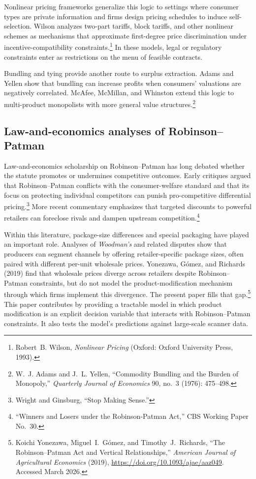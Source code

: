 \documentclass[12pt]{article}
\theoremstyle{definition}
\begin{document}
Nonlinear pricing frameworks generalize this logic to settings where consumer types are private information and firms design pricing schedules to induce self-selection.
Wilson analyzes two-part tariffs, block tariffs, and other nonlinear schemes as mechanisms that approximate first-degree price discrimination under incentive-compatibility constraints.\footnote{Robert~B. Wilson, \textit{Nonlinear Pricing} (Oxford: Oxford University Press, 1993).}
In these models, legal or regulatory constraints enter as restrictions on the menu of feasible contracts.

Bundling and tying provide another route to surplus extraction.
Adams and Yellen show that bundling can increase profits when consumers' valuations are negatively correlated. McAfee, McMillan, and Whinston extend this logic to multi-product monopolists with more general value structures.\footnote{W.~J. Adams and J.~L. Yellen, ``Commodity Bundling and the Burden of Monopoly,'' \textit{Quarterly Journal of Economics} 90, no.~3 (1976): 475--498.}

\subsection{Law-and-economics analyses of Robinson--Patman}

Law-and-economics scholarship on Robinson--Patman has long debated whether the statute promotes or undermines competitive outcomes.
Early critiques argued that Robinson--Patman conflicts with the consumer-welfare standard and that its focus on protecting individual competitors can punish pro-competitive differential pricing.\footnote{Wright and Ginsburg, ``Stop Making Sense.''}
More recent commentary emphasizes that targeted discounts to powerful retailers can foreclose rivals and dampen upstream competition.\footnote{``Winners and Losers under the Robinson-Patman Act,'' CBS Working Paper No.\ 30.}

Within this literature, package-size differences and special packaging have played an important role.
Analyses of \textit{Woodman's} and related disputes show that producers can segment channels by offering retailer-specific package sizes, often paired with different per-unit wholesale prices.
Yonezawa, G\'{o}mez, and Richards (2019) find that wholesale prices diverge across retailers despite Robinson--Patman constraints, but do not model the product-modification mechanism through which firms implement this divergence. The present paper fills that gap.\footnote{Koichi Yonezawa, Miguel~I.\ G\'{o}mez, and Timothy~J.\ Richards, ``The Robinson--Patman Act and Vertical Relationships,'' \textit{American Journal of Agricultural Economics} (2019), \url{https://doi.org/10.1093/ajae/aaz049}. Accessed March 2026.}
This paper contributes by providing a tractable model in which product modification is an explicit decision variable that interacts with Robinson--Patman constraints. It also tests the model's predictions against large-scale scanner data.
\end{document}
